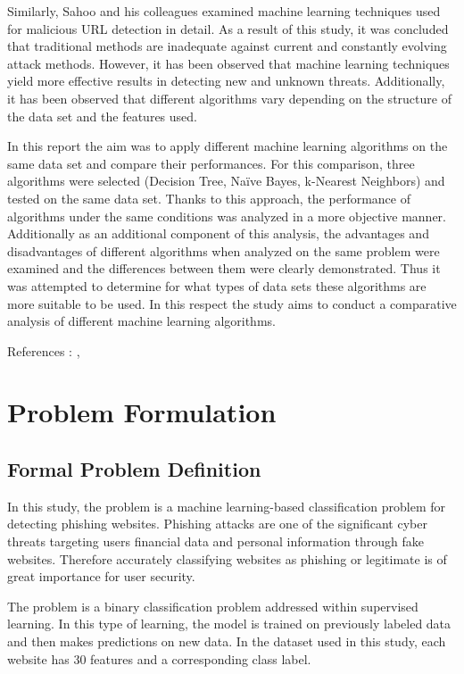 \documentclass[conference]{IEEEtran}
\begin{document}
    Similarly, Sahoo and his colleagues examined machine learning techniques used for malicious URL detection in detail. As a result of this study, it was concluded that traditional methods are inadequate against current and constantly evolving attack methods. However, it has been observed that machine learning techniques yield more effective results in detecting new and unknown threats. Additionally, it has been observed that different algorithms vary depending on the structure of the data set and the features used.\cite{b2}

    In this report the aim was to apply different machine learning algorithms on the same data set and compare their performances. For this comparison, three algorithms were selected (Decision Tree, Naïve Bayes, k-Nearest Neighbors) and tested on the same data set. Thanks to this approach, the performance of algorithms under the same conditions was analyzed in a more objective manner. Additionally as an additional component of this analysis, the advantages and disadvantages of different algorithms when analyzed on the same problem were examined and the differences between them were clearly demonstrated. Thus it was attempted to determine for what types of data sets these algorithms are more suitable to be used. In this respect the study aims to conduct a comparative analysis of different machine learning algorithms.
   
    References : 
\cite{b2},\cite{b3}
	
	\section{Problem Formulation}
	\label{sec:problem}
	
	\subsection{Formal Problem Definition}
In this study, the problem is a machine learning-based classification problem for detecting phishing websites. Phishing attacks are one of the significant cyber threats targeting users financial data and personal information through fake websites. Therefore accurately classifying websites as phishing or legitimate is of great importance for user security.

    The problem is a binary classification problem addressed within supervised learning. In this type of learning, the model is trained on previously labeled data and then makes predictions on new data. In the dataset used in this study, each website has 30 features and a corresponding class label.
\end{document}
